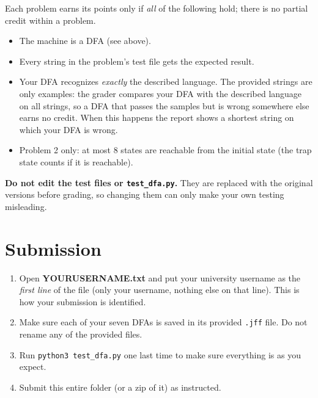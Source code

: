 \documentclass[11pt]{article}
\begin{document}
Each problem earns its points only if \emph{all} of the following hold; there is no partial
credit within a problem.
\begin{itemize}
  \item The machine is a DFA (see above).
  \item Every string in the problem's test file gets the expected result.
  \item Your DFA recognizes \emph{exactly} the described language. The provided strings are
        only examples: the grader compares your DFA with the described language on all
        strings, so a DFA that passes the samples but is wrong somewhere else earns no
        credit. When this happens the report shows a shortest string on which your DFA is
        wrong.
  \item Problem 2 only: at most 8 states are reachable from the initial state (the trap state
        counts if it is reachable).
\end{itemize}

\textbf{Do not edit the test files or \texttt{test\_dfa.py}.} They are replaced with the
original versions before grading, so changing them can only make your own testing misleading.

\section*{Submission}

\begin{enumerate}
  \item Open \textbf{YOURUSERNAME.txt} and put your university username as the \emph{first
        line} of the file (only your username, nothing else on that line). This is how your
        submission is identified.
  \item Make sure each of your seven DFAs is saved in its provided \texttt{.jff} file. Do not
        rename any of the provided files.
  \item Run \texttt{python3 test\_dfa.py} one last time to make sure everything is as you
        expect.
  \item Submit this entire folder (or a zip of it) as instructed.
\end{enumerate}
\end{document}
